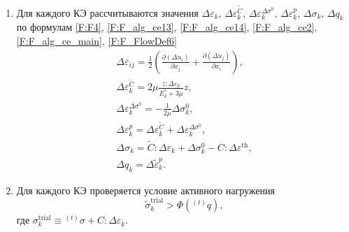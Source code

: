 \begin{enumerate}
	\item
	Для каждого КЭ рассчитываются значения $\Delta\varepsilon_k$, $\Delta\varepsilon_k^{\tilde{C}}$, $\Delta\varepsilon_k^{\Delta\sigma^0}$, $\Delta\varepsilon_k^p$, $\Delta\sigma_k$, $\Delta q_k$ по формулам \eqref{F:F4}, \eqref{F:F_alg_ce13}, \eqref{F:F_alg_ce14}, \eqref{F:F_alg_ce2}, \eqref{F:F_alg_ce_main}, \eqref{F:F_FlowDef6}
	\begin{equation}
	\begin{gathered}
	\Delta\varepsilon_{ij}=\frac{1}{2} \left(\frac{\partial\left( \Delta u_i\right) }{\partial x_{j}} + \frac{\partial \left( \Delta u_j\right) }{\partial x_{i}} \right),\\
	\Delta\varepsilon_k^{\tilde{C}}=2\mu\frac{z:\Delta\varepsilon_{k}}{E_{k}^{*}+3\mu}z,\\
	\Delta\varepsilon_k^{\Delta\sigma^{0}}=-\frac{1}{2\mu}\Delta\sigma_k^{0},\\
	\Delta\varepsilon_k^p=\Delta\varepsilon_k^{\tilde {C}}+\Delta\varepsilon_k^{\Delta\sigma^0},\\
	\Delta\sigma_k=\tilde{C}:\Delta\varepsilon_k+\Delta\sigma_k^{0}-C:\Delta\varepsilon^{\mathrm{th}},\\
	\Delta q_k=\Delta\tilde{\varepsilon}_k^p.
	\label{F:F_algoritm7}
	\end{gathered}
	\end{equation}
	
	
	
	
	\item
	\label {itm:alg_h}
	Для каждого КЭ проверяется условие активного нагружения
	\begin{equation}
	\tilde{\sigma}_k^{\mathrm{trial}}>\Phi\left({}^{(t)}q\right),
	\label{F:F_algoritm_ep_active_condition}
	\end{equation}
	где
	$\sigma_k^{\mathrm{trial}}\equiv{}^{(t)}\sigma+C:\Delta\varepsilon_k.$
	

\end{enumerate}
